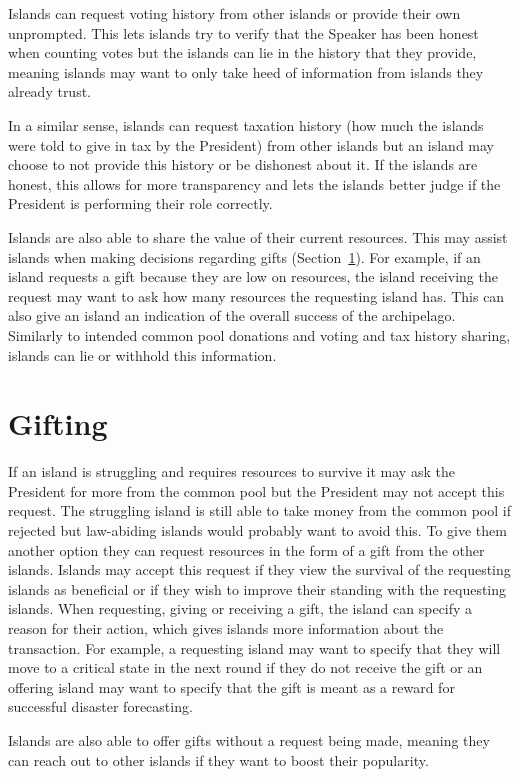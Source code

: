 Islands can request voting history from other islands or provide their own unprompted. This lets islands try to verify that the Speaker has been honest when counting votes but the islands can lie in the history that they provide, meaning islands may want to only take heed of information from islands they already trust. 

In a similar sense, islands can request taxation history (how much the islands were told to give in tax by the President) from other islands but an island may choose to not provide this history or be dishonest about it. If the islands are honest, this allows for more transparency and lets the islands better judge if the President is performing their role correctly.

Islands are also able to share the value of their current resources. This may assist islands when making decisions regarding gifts (Section~\ref{sec:IITO:gifting}). For example, if an island requests a gift because they are low on resources, the island receiving the request may want to ask how many resources the requesting island has. This can also give an island an indication of the overall success of the archipelago. Similarly to intended common pool donations and voting and tax history sharing, islands can lie or withhold this information.

\section{Gifting}  
\label{sec:IITO:gifting}  

If an island is struggling and requires resources to survive it may ask the President for more from the common pool but the President may not accept this request. The struggling island is still able to take money from the common pool if rejected but law-abiding islands would probably want to avoid this. To give them another option they can request resources in the form of a gift from the other islands. Islands may accept this request if they view the survival of the requesting islands as beneficial or if they wish to improve their standing with the requesting islands. When requesting, giving or receiving a gift, the island can specify a reason for their action, which gives islands more information about the transaction. For example, a requesting island may want to specify that they will move to a critical state in the next round if they do not receive the gift or an offering island may want to specify that the gift is meant as a reward for successful disaster forecasting.

Islands are also able to offer gifts without a request being made, meaning they can reach out to other islands if they want to boost their popularity.